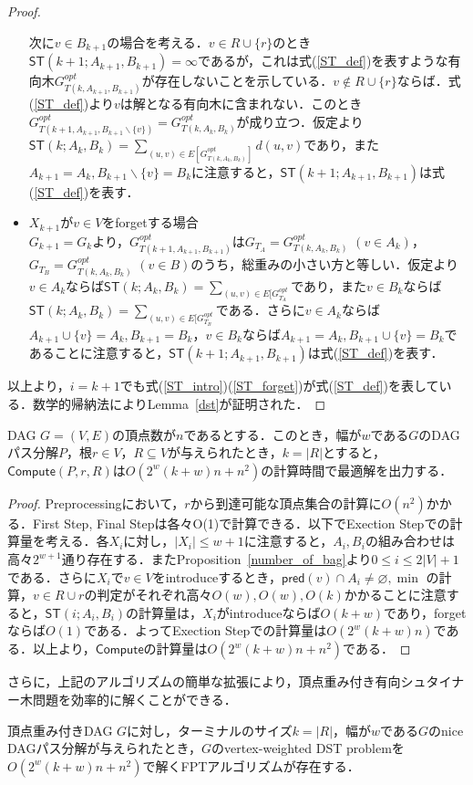 \begin{proof}
\begin{itemize}
        次に$v \in B_{k+1}$の場合を考える．$v \in R \cup \{r\}$のとき$\mathsf{ST}(k+1; A_{k+1}, B_{k+1}) = \infty$であるが，これは式(\ref{ST_def})を表すような有向木$G^{opt}_{T(k, A_{k+1}, B_{k+1})}$が存在しないことを示している．$v \notin R \cup \{r\}$ならば．式(\ref{ST_def})より$v$は解となる有向木に含まれない．このとき$G^{opt}_{T(k+1, A_{k+1}, B_{k+1} \backslash \{v\})} = G^{opt}_{T(k, A_k, B_k)}$が成り立つ．仮定より$\mathsf{ST}(k; A_k, B_k) = \sum_{(u, v) \in E[G^{opt}_{T(k, A_k, B_k)}]} d(u, v)$であり，また$A_{k+1} = A_k, B_{k+1} \backslash \{v\} = B_k$に注意すると，$\mathsf{ST}(k+1; A_{k+1}, B_{k+1})$は式(\ref{ST_def})を表す．
        
        \item $X_{k+1}$が$v \in V$をforgetする場合 \\
        $G_{k+1} = G_k$より，$G^{opt}_{T(k+1, A_{k+1}, B_{k+1})}$は$G_{T_A} = G^{opt}_{T(k, A_k, B_k)}$ $(v \in A_k)$，$G_{T_B} = G^{opt}_{T(k, A_k, B_k)}$ $(v \in B)$のうち，総重みの小さい方と等しい．仮定より$v \in A_k$ならば$\mathsf{ST}(k; A_k, B_k) = \sum_{(u, v) \in E[G^{opt}_{T_A}}$であり，また$v \in B_k$ならば$\mathsf{ST}(k; A_k, B_k) = \sum_{(u, v) \in E[G^{opt}_{T_B}}$である．さらに$v \in A_k$ならば$A_{k+1} \cup \{v\} = A_k, B_{k+1} = B_k$，$v \in B_k$ならば$A_{k+1} = A_k, B_{k+1} \cup \{v\} = B_k$であることに注意すると，$\mathsf{ST}(k+1; A_{k+1}, B_{k+1})$は式(\ref{ST_def})を表す．
    \end{itemize}
    以上より，$i = k+1$でも式(\ref{ST_intro})(\ref{ST_forget})が式(\ref{ST_def})を表している．数学的帰納法によりLemma~\ref{dst}が証明された．
\end{proof}


\begin{lemma}
    DAG $G = (V, E)$の頂点数が$n$であるとする．このとき，幅が$w$である$G$のDAGパス分解$P$，根$r \in V$，$R \subseteq V$が与えられたとき，$k = |R|$とすると，$\mathsf{Compute}(P, r, R)$は$O(2^w(k+w)n + n^2)$の計算時間で最適解を出力する．
\end{lemma}

\begin{proof}
    Preprocessingにおいて，$r$から到達可能な頂点集合の計算に$O(n^2)$かかる．First Step, Final Stepは各々O(1)で計算できる．以下でExection Stepでの計算量を考える．各$X_i$に対し，$|X_i| \leq w + 1$に注意すると，$A_i, B_i$の組み合わせは高々$2^{w+1}$通り存在する．またProposition~\ref{number_of_bag}より$0 \leq i \leq 2|V|+1$である．さらに$X_i$で$v \in V$をintroduceするとき，$\mathsf{pred}(v) \cap A_i \neq \varnothing, \min$ の計算，$v \in R \cup {r}$の判定がそれぞれ高々$O(w), O(w), O(k)$かかることに注意すると，$\mathsf{ST}(i; A_i, B_i)$の計算量は，$X_i$がintroduceならば$O(k+w)$であり，forgetならば$O(1)$である．よってExection Stepでの計算量は$O(2^w(k+w)n)$である．以上より，$\mathsf{Compute}$の計算量は$O(2^w(k+w)n + n^2)$である．
\end{proof}

さらに，上記のアルゴリズムの簡単な拡張により，頂点重み付き有向シュタイナー木問題を効率的に解くことができる．

\begin{theorem}
    頂点重み付きDAG $G$に対し，ターミナルのサイズ$k=|R|$，幅が$w$である$G$のnice DAGパス分解が与えられたとき，$G$のvertex-weighted DST problemを$O(2^w(k+w)n + n^2)$で解くFPTアルゴリズムが存在する．
\end{theorem}